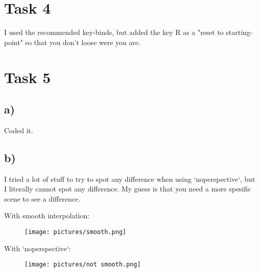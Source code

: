 \section{Task 4}
I used the recommended key-binds, but added the key R as a "reset to starting-point" so that you don't loose were you are.

\section{Task 5}
\subsection{a)}
Coded it.
\subsection{b)}
I tried a lot of stuff to try to spot any difference when using `noperspective`, but I literally cannot spot any difference. My guess is that you need a more spesific scene to see a difference.

With smooth interpolation:
\begin{figure}[h]
    \centering
    \texttt{[image: pictures/smooth.png]}
\end{figure}

With `noperspective`:
\begin{figure}[h!]
    \centering
    \texttt{[image: pictures/not smooth.png]}
\end{figure}
